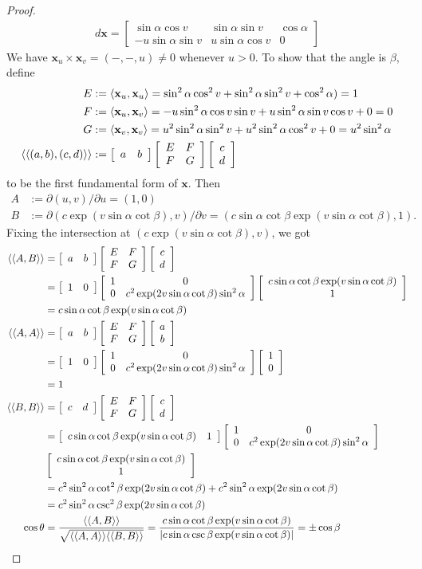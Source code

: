 \documentclass[10pt,a4paper]{article}
\begin{document}
\begin{proof}
\begin{align*}
d\mathbf{x} = \left[\begin{array}{ccc}\sin\alpha\cos v & \sin\alpha\sin v & \cos\alpha \\ -u\sin\alpha\sin v & u\sin\alpha\cos v & 0\end{array}\right]
\end{align*}
We have $\mathbf{x}_u \times \mathbf{x}_v = (-, -, u)\neq 0$ whenever $u > 0$.
To show that the angle is $\beta$, define
\begin{align*}
E &:= \langle \mathbf{x}_u, \mathbf{x}_u\rangle = \sin^2\alpha\cos^2 v + \sin^2\alpha\sin^2 v + \cos^2\alpha) = 1\\
F &:= \langle \mathbf{x}_u, \mathbf{x}_v\rangle = -u\sin^2\alpha\cos v\sin v + u\sin^2\alpha\sin v\cos v + 0 = 0\\
G &:= \langle \mathbf{x}_v, \mathbf{x}_v\rangle = u^2\sin^2\alpha\sin^2 v + u^2\sin^2\alpha\cos^2 v + 0 = u^2\sin^2\alpha\\
\langle\langle (a, b), (c, d)\rangle\rangle &:= 
\mat abcdEFG
\end{align*}
to be the first fundamental form of $\mathbf{x}$. Then
\begin{align*}
A &:= \partial(u, v)/\partial u = (1, 0) \\
B &:= \partial(c\exp(v\sin\alpha \cot \beta), v)/\partial v = (c\sin\alpha\cot\beta\exp(v\sin\alpha\cot\beta), 1).
\end{align*}
Fixing the intersection at $(c\exp(v\sin\alpha\cot\beta), v)$, we got
\begin{align*}
\langle\langle A, B\rangle\rangle &= \mat abcdEFG  \\&= \mat 10{c\sin\alpha\cot\beta\exp(v\sin\alpha\cot\beta)}110{c^2\exp(2v\sin\alpha\cot\beta)\sin^2\alpha} \\&= c\sin\alpha\cot\beta\exp(v\sin\alpha\cot\beta)\\
\langle\langle A, A\rangle\rangle &= \mat ababEFG  \\&= \mat 101010{c^2\exp(2v\sin\alpha\cot\beta)\sin^2\alpha} \\&= 1\\
\langle\langle B, B\rangle\rangle &= \mat cdcdEFG  \\&= \matnl {c\sin\alpha\cot\beta\exp(v\sin\alpha\cot\beta)}1{c\sin\alpha\cot\beta\exp(v\sin\alpha\cot\beta)}110{c^2\exp(2v\sin\alpha\cot\beta)\sin^2\alpha} \\&= c^2\sin^2\alpha\cot^2\beta\exp(2v\sin\alpha\cot\beta) + c^2\sin^2\alpha\exp(2v\sin\alpha\cot\beta)\\
&=c^2\sin^2\alpha\csc^2\beta\exp(2v\sin\alpha\cot\beta)\\
\cos\theta &= \frac{\langle\langle A, B\rangle\rangle}{\sqrt{\langle\langle A, A\rangle\rangle\langle\langle B, B\rangle\rangle}} = \frac{c\sin\alpha\cot\beta\exp(v\sin\alpha\cot\beta)}{\left|c\sin\alpha\csc\beta\exp(v\sin\alpha\cot\beta)\right|} = \pm \cos\beta\\
\end{align*}
\end{proof}
\end{document}
